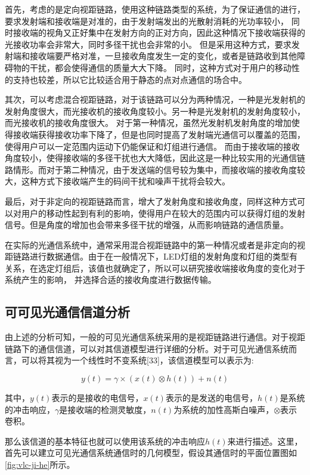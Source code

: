 首先，考虑的是定向视距链路，使用这种链路类型的系统，为了保证通信的进行，要求发射端和接收端是对准的，由于发射端发出的光散射消耗的光功率较小，
同时接收端的视角又正好集中在发射方向的正对方向，因此这种情况下接收端获得的光接收功率会非常大，同时多径干扰也会非常的小。
但是采用这种方式，要求发射端和接收端要严格对准，一旦接收角度发生一定的变化，或者是链路收到其他障碍物的干扰，都会使得通信的质量大大下降。
同时，这种方式对于用户的移动性的支持也较差，所以它比较适合用于静态的点对点通信的场合中。

其次，可以考虑混合视距链路，对于该链路可以分为两种情况，一种是光发射机的发射角度很大，而光接收机的接收角度较小。另一种是光发射机的发射角度较小，而光接收机的接收角度很大。
对于第一种情况，虽然光发射机发射角度的增加使得接收端获得接收功率下降了，但是也同时提高了发射端光通信可以覆盖的范围，使得用户可以一定范围内运动下仍能保证和灯组进行通信。
而由于接收端的接收角度较小，使得接收端的多径干扰也大大降低，因此这是一种比较实用的光通信链路情形。而对于第二种情况，由于发送端的信号较为集中，而接收端的接收角度较大，这种方式下接收端产生的码间干扰和噪声干扰将会较大。

最后，对于非定向的视距链路而言，增大了发射角度和接收角度，同样这种方式可以对用户的移动性起到有利的影响，使得用户在较大的范围内可以获得灯组的发射信号。但是角度的增加也会带来多径干扰的增强，从而影响链路的通信质量。

在实际的光通信系统中，通常采用混合视距链路中的第一种情况或者是非定向的视距链路进行数据通信。由于在一般情况下，LED灯组的发射角度和灯组的类型有关系，在选定灯组后，该值也就确定了，所以可以研究接收端接收角度的变化对于系统产生的影响，
并选择合适的接收角度进行数据传输。

\subsection{可可见光通信信道分析}\label{sec:vlc-channel}
由上述的分析可知，一般的可见光通信系统采用的是视距链路进行通信。对于视距链路下的通信信道，可以对其信道模型进行详细的分析。对于可见光通信系统而言，可以将其视为一个线性时不变系统[33]，该信道模型可以表示为:

\begin{equation}
    y(t) = \gamma \times (x(t) \otimes h(t)) + n(t)
    \label{equ:baseband-channel}
\end{equation}

其中，$y(t)$表示的是接收的电信号，$x(t)$表示的是发送的电信号，$h(t)$是系统的冲击响应，$\gamma$是接收端的检测灵敏度，$n(t)$为系统的加性高斯白噪声，$\otimes$表示卷积。

那么该信道的基本特征也就可以使用该系统的冲击响应$h(t)$来进行描述。这里，首先可以建立可见光通信系统通信时的几何模型，假设其通信时的平面位置图如\autoref{fig:vlc-ji-he}所示。

